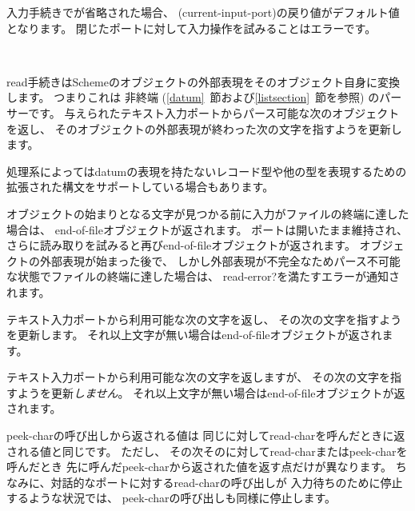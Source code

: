入力手続きでが省略された場合、
{\cf (current-input-port)}の戻り値がデフォルト値となります。
閉じたポートに対して入力操作を試みることはエラーです。

\noindent \hbox{ }  %
\vspace{-5ex}


\begin{entry}{%
}

{\cf read}手続きはSchemeのオブジェクトの外部表現をそのオブジェクト自身に変換します。
つまりこれは
非終端 (\ref{datum}~節および\ref{listsection}~節を参照)
のパーサーです。
与えられたテキスト入力ポートからパース可能な次のオブジェクトを返し、
そのオブジェクトの外部表現が終わった次の文字を指すようを更新します。

処理系によってはdatumの表現を持たないレコード型や他の型を表現するための
拡張された構文をサポートしている場合もあります。

\vest オブジェクトの始まりとなる文字が見つかる前に入力がファイルの終端に達した場合は、
end-of-fileオブジェクトが返されます。
ポートは開いたまま維持され、
さらに読み取りを試みると再びend-of-fileオブジェクトが返されます。
オブジェクトの外部表現が始まった後で、
しかし外部表現が不完全なためパース不可能な状態でファイルの終端に達した場合は、
{\cf read-error?}を満たすエラーが通知されます。

\end{entry}

\begin{entry}{%
}

テキスト入力ポートから利用可能な次の文字を返し、
その次の文字を指すようを更新します。
それ以上文字が無い場合はend-of-fileオブジェクトが返されます。

\end{entry}


\begin{entry}{%
}

テキスト入力ポートから利用可能な次の文字を返しますが、
その次の文字を指すようを更新{\em しません}。
それ以上文字が無い場合はend-of-fileオブジェクトが返されます。

\begin{note}
{\cf peek-char}の呼び出しから返される値は
同じに対して{\cf read-char}を呼んだときに返される値と同じです。
ただし、
その次そのに対して{\cf read-char}または{\cf peek-char}を呼んだとき
先に呼んだ{\cf peek-char}から返された値を返す点だけが異なります。
ちなみに、対話的なポートに対する{\cf read-char}の呼び出しが
入力待ちのために停止するような状況では、
{\cf peek-char}の呼び出しも同様に停止します。
\end{note}

\end{entry}

